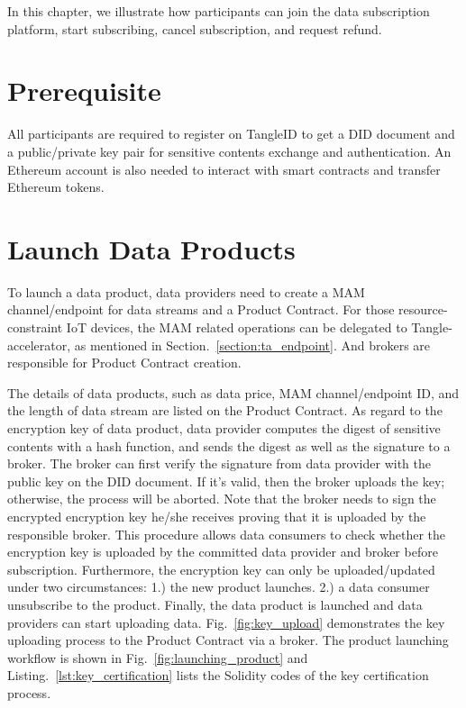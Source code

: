 \begin{spacing}{2.0}
\label{section:trading_model}
In this chapter, we illustrate how participants can join the data subscription platform, start subscribing, cancel subscription, and request refund.

\section{Prerequisite}
All participants are required to register on TangleID to get a DID document and a  public/private key pair for sensitive contents exchange and authentication. An Ethereum account is also needed to interact with smart contracts and transfer Ethereum tokens.

\section{Launch Data Products}
\label{section:launch_data_product}
To launch a data product, data providers need to create a MAM channel/endpoint for data streams and a Product Contract. For those resource-constraint IoT devices, the MAM related operations can be delegated to Tangle-accelerator, as mentioned in Section.~\ref{section:ta_endpoint}. And brokers are responsible for Product Contract creation.

The details of data products, such as data price, MAM channel/endpoint ID, and the length of data stream are listed on the Product Contract. As regard to the encryption key of data product, data provider computes the digest of sensitive contents with a hash function, and sends the digest as well as the signature to a  broker. The broker can first verify the signature from data provider with the public key on the DID document. If it's valid, then the broker uploads the key; otherwise, the process will be aborted. Note that the broker needs to sign the encrypted encryption key he/she receives proving that it is uploaded by the responsible broker. This procedure allows data consumers to check whether the encryption key is uploaded by the committed data provider and broker before subscription. Furthermore, the encryption key can only be uploaded/updated under two circumstances: 1.) the new product launches. 2.) a data consumer unsubscribe to the product. Finally, the data product is launched and data providers can start uploading data. Fig.~\ref{fig:key_upload} demonstrates the key uploading process to the Product Contract via a broker. The product launching workflow is shown in Fig.~\ref{fig:launching_product} and Listing.~\ref{lst:key_certification} lists the Solidity codes of the key certification process.
\clearpage


\end{spacing}
